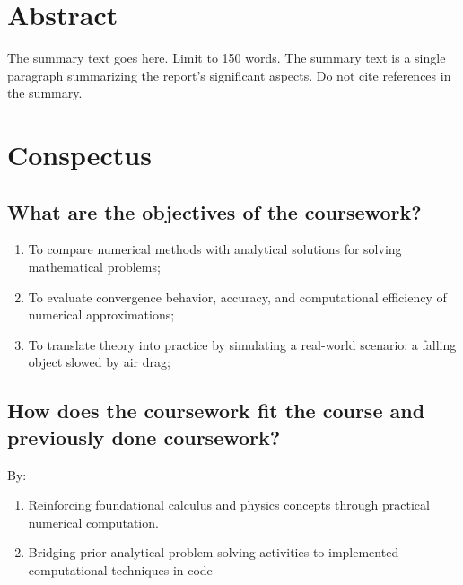 \maketitle %






\section{Abstract}
The summary text goes here. Limit to 150 words. The summary text is a single paragraph summarizing the report's significant aspects. Do not cite references in the summary.


\section{Conspectus}
\label{sec:cnspcts}

\IEEEpubidadjcol %

\subsection{What are the objectives of the coursework?}

\begin{enumerate}
\item To compare numerical methods with analytical solutions for solving mathematical problems;
\item To evaluate convergence behavior, accuracy, and computational efficiency of numerical approximations;
\item To translate theory into practice by simulating a real-world scenario: a falling object slowed by air drag;
\end{enumerate}	
	
\subsection{How does the coursework fit the course and previously done coursework?}
By:
\begin{enumerate}
\item Reinforcing foundational calculus and physics concepts through practical numerical computation.
\item Bridging prior analytical problem-solving activities to implemented computational techniques in code
\end{enumerate}	



